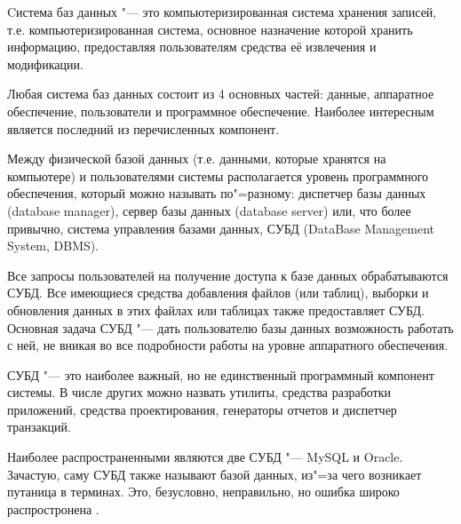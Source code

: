 Cистема баз данных "--- это компьютеризированная система
хранения записей, т.е. компьютеризированная система, основное назначение
которой хранить информацию, предоставляя пользователям средства её извлечения
и модификации.

Любая система баз данных состоит из 4 основных частей: данные, аппаратное обеспечение,
пользователи и программное обеспечение. Наиболее интересным является последний из перечисленных компонент. 

Между физической базой данных (т.е. данными, которые хранятся на компьютере) 
и пользователями системы располагается уровень программного
обеспечения, который можно называть по"=разному: диспетчер базы данных (database
manager), сервер базы данных (database server) или, что более привычно, система
управления базами данных, СУБД (DataBase Management System, DBMS). 

Все запросы пользователей на получение доступа к базе данных обрабатываются СУБД. 
Все имеющиеся средства добавления файлов (или таблиц), выборки и обновления данных в
этих файлах или таблицах также предоставляет СУБД. Основная задача СУБД "--- дать
пользователю базы данных возможность работать с ней, не вникая во все
подробности работы на уровне аппаратного обеспечения.

СУБД "--- это наиболее важный, но не единственный программный компонент системы. В
числе других можно назвать утилиты, средства разработки приложений,
средства проектирования, генераторы отчетов и диспетчер транзакций. 

Наиболее распространенными являются две СУБД "--- MySQL и Oracle. Зачастую, саму СУБД также называют
базой данных, из"=за чего возникает путаница в терминах. Это, безусловно,
неправильно, но ошибка широко распростронена \cite{date}.